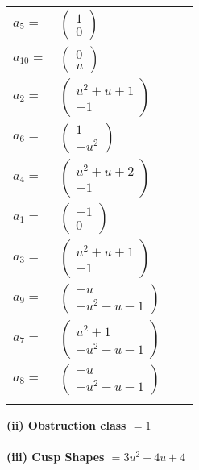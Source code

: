 \documentclass[1p]{elsarticle_modified}
\theoremstyle{definition}
\begin{document}
\begin{tabular}{m{7pt} m{180pt} m{7pt} m{180pt} }
\flushright $a_{5}=$&$\begin{pmatrix}1\\0\end{pmatrix}$ \\
\flushright $a_{10}=$&$\begin{pmatrix}0\\u\end{pmatrix}$ \\
\flushright $a_{2}=$&$\begin{pmatrix}u^2+u+1\\-1\end{pmatrix}$ \\
\flushright $a_{6}=$&$\begin{pmatrix}1\\- u^2\end{pmatrix}$ \\
\flushright $a_{4}=$&$\begin{pmatrix}u^2+u+2\\-1\end{pmatrix}$ \\
\flushright $a_{1}=$&$\begin{pmatrix}-1\\0\end{pmatrix}$ \\
\flushright $a_{3}=$&$\begin{pmatrix}u^2+u+1\\-1\end{pmatrix}$ \\
\flushright $a_{9}=$&$\begin{pmatrix}- u\\- u^2- u-1\end{pmatrix}$ \\
\flushright $a_{7}=$&$\begin{pmatrix}u^2+1\\- u^2- u-1\end{pmatrix}$ \\
\flushright $a_{8}=$&$\begin{pmatrix}- u\\- u^2- u-1\end{pmatrix}$\\&\end{tabular}
\flushleft \textbf{(ii) Obstruction class $= 1$}\\~\\
\flushleft \textbf{(iii) Cusp Shapes $= 3 u^2+4 u+4$}\\~\\
\end{document}
